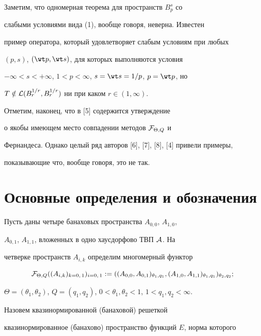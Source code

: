 Заметим, что одномерная теорема для пространств $B^s_p$ со


слабыми условиями вида (1), вообще говоря, неверна. Известен


пример оператора, который удовлетворяет слабым условиям при любых


$(p,s)$, $(\wt p, \wt s)$, для которых выполняются условия


$-\infty < s< +\infty$, $1<p<\infty$, $s=\wt s =1/p$, $p=\wt p$, но


$T\notin {\cal L}(B^{1/r}_r,B^{1/r}_r)$ ни при каком $r\in (1,\infty)$.





Отметим, наконец, что в [5] содержится утверждение


о якобы имеющем место совпадении методов ${\cal F}_{\Theta, Q}$ и


Фернандеса. Однако целый ряд авторов [6], [7], [8], [4] привели примеры,


показывающие что, вообще говоря, это не так.





\section{Основные определения и обозначения}





Пусть даны четыре банаховых пространства $A_{0,0}$, $A_{1,0}$,


$A_{0,1}$, $A_{1,1}$, вложенных в одно хаусдорфово ТВП $\cal A$. На


четверке пространств $A_{i,k}$ определим многомерный функтор


$$


{\cal F}_{\Theta, Q}((A_{i,k})_{k=0,\,1})_{i=0,\,1}:=


((A_{0,0}, A_{0,1})_{\theta_1, q_1}, (A_{1,0}, A_{1,1})_{\theta_1,


q_1})_{\theta_2, q_2};


$$


$\Theta =(\theta_1, \theta_2)$, $Q=(q_1, q_2)$, $0< \theta_1,


\theta_2 <1$, $1< q_1,q_2 <\infty$.





Назовем квазинормированной (банаховой) решеткой


квазинормированное (банахово) пространство функций $E$, норма которого


